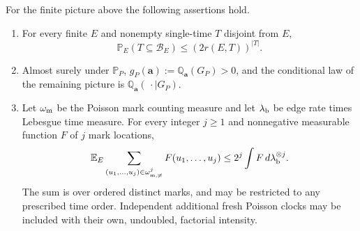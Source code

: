 \begin{lemma}\label{lem:pin-inputs}
For the finite picture above the following assertions hold.
\begin{enumerate}[label=(\roman*),leftmargin=*]
\item For every finite $E$ and nonempty single-time $T$ disjoint from $E$,
\begin{equation}\label{eq:simultaneous-pin}
                  \mathbb P_E(T\subseteq\mathcal B_E)
                                  \le(2r(E,T))^{|T|}.
\end{equation}
\item Almost surely under $\mathbb P_P$,
$g_P(\mathbf a):=\mathbb Q_{\mathbf a}(G_P)>0$, and the conditional
law of the remaining picture is
$\mathbb Q_{\mathbf a}(\,\cdot\mid G_P)$.
\item Let $\omega_{\rm m}$ be the Poisson mark counting measure and
let $\lambda_{\rm b}$ be edge rate times Lebesgue time measure.
For every integer $j\ge1$
and nonnegative measurable function $F$ of $j$ mark locations,
\begin{equation}\label{eq:factorial-domination}
 \mathbb E_E\sum_{(u_1,\ldots,u_j)\in\omega_{\rm m,\ne}^j}
                F(u_1,\ldots,u_j)
       \le 2^j\int F\,d\lambda_{\rm b}^{\otimes j}.
\end{equation}
The sum is over ordered distinct marks, and may be restricted to any
prescribed time order.  Independent additional fresh Poisson clocks
may be included with their own, undoubled, factorial intensity.
\end{enumerate}
\end{lemma}

